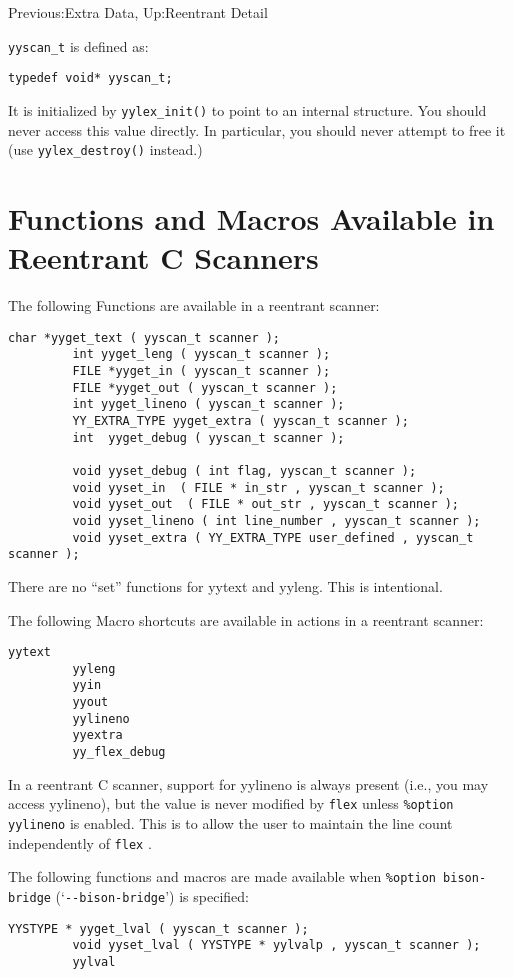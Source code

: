 \documentclass[openany,oneside]{book}
\begin{document}
Previous:Extra Data,
Up:Reentrant Detail

 \verb`yyscan_t` is defined as:
\begin{verbatim}
typedef void* yyscan_t;
\end{verbatim}


It is initialized by \verb`yylex_init()` to point to
an internal structure. You should never access this value
directly. In particular, you should never attempt to free it
(use \verb`yylex_destroy()` instead.)
\section{Functions and Macros Available in Reentrant C Scanners}


The following Functions are available in a reentrant scanner:


\begin{verbatim}
char *yyget_text ( yyscan_t scanner );
         int yyget_leng ( yyscan_t scanner );
         FILE *yyget_in ( yyscan_t scanner );
         FILE *yyget_out ( yyscan_t scanner );
         int yyget_lineno ( yyscan_t scanner );
         YY_EXTRA_TYPE yyget_extra ( yyscan_t scanner );
         int  yyget_debug ( yyscan_t scanner );
     
         void yyset_debug ( int flag, yyscan_t scanner );
         void yyset_in  ( FILE * in_str , yyscan_t scanner );
         void yyset_out  ( FILE * out_str , yyscan_t scanner );
         void yyset_lineno ( int line_number , yyscan_t scanner );
         void yyset_extra ( YY_EXTRA_TYPE user_defined , yyscan_t scanner );
\end{verbatim}


There are no “set” functions for yytext and yyleng. This is intentional.

The following Macro shortcuts are available in actions in a reentrant
scanner:
\begin{verbatim}
yytext
         yyleng
         yyin
         yyout
         yylineno
         yyextra
         yy_flex_debug
\end{verbatim}


In a reentrant C scanner, support for yylineno is always present
(i.e., you may access yylineno), but the value is never modified by \verb`flex` unless \verb`%option yylineno` is enabled. This is to allow
the user to maintain the line count independently of \verb`flex` .

The following functions and macros are made available when \verb`%option bison-bridge` (‘\verb`--bison-bridge`’) is specified:
\begin{verbatim}
YYSTYPE * yyget_lval ( yyscan_t scanner );
         void yyset_lval ( YYSTYPE * yylvalp , yyscan_t scanner );
         yylval
\end{verbatim}
\end{document}
